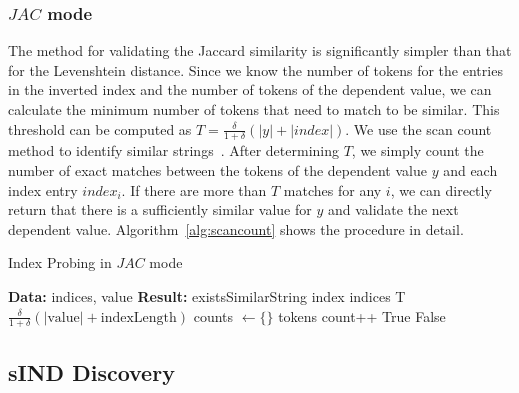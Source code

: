 \subsubsection{$JAC$ mode}
The method for validating the Jaccard similarity is significantly simpler than that for the Levenshtein distance.
Since we know the number of tokens for the entries in the inverted index and the number of tokens of the dependent value, we can calculate the minimum number of tokens that need to match to be similar.
This threshold can be computed as $T = \frac{\delta}{1+\delta}(|y|+|index|)$.
We use the scan count method to identify similar strings~\cite{StringSimSurvey}.
After determining $T$, we simply count the number of exact matches between the tokens of the dependent value $y$ and each index entry $index_i$.
If there are more than $T$ matches for any $i$, we can directly return that there is a sufficiently similar value for $y$ and validate the next dependent value.
Algorithm~\ref{alg:scancount} shows the procedure in detail.

\begin{algorithm}
\caption{Index Probing in $JAC$ mode}
\label{alg:scancount}
\begin{algorithmic}[1]
\begin{itshape}
\Statex \textbf{Data:} indices, value
\Statex \textbf{Result:} existsSimilarString
        \State index \mgets{} indices
        \State T \mgets{} $\frac{\delta}{1+\delta}(|\text{value}|+\text{indexLength})$
        \State counts $\gets \{\}$
        \State tokens \mgets{} 
                \State count++
                    \State \Return True
                \EndIf
            \EndFor
        \EndFor
    \EndFor
    \State \Return False
\EndFunction
\end{itshape}
\end{algorithmic}
\end{algorithm}



\subsection{sIND Discovery}
\label{subsection:sind:combination}

